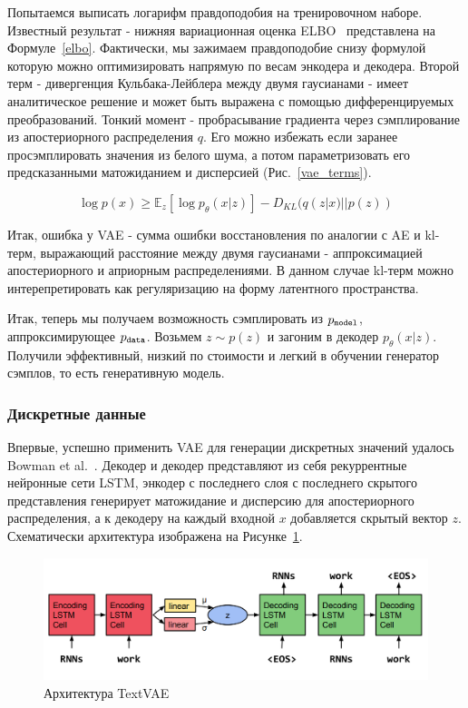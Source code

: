 \documentclass{spbau-diploma}
\begin{document}
Попытаемся выписать логарифм правдоподобия на тренировочном наборе. Известный 
результат - нижняя вариационная оценка ELBO~\cite{vae} представлена на 
Формуле~\ref{elbo}. Фактически, мы зажимаем правдоподобие снизу формулой которую
можно оптимизировать напрямую по весам энкодера и декодера. Второй терм - 
дивергенция Кульбака-Лейблера между двумя гаусианами - имеет аналитическое 
решение и может быть выражена с помощью дифференцируемых преобразований. Тонкий
момент - пробрасывание градиента через сэмплирование из апостериорного 
распределения $q$. Его можно избежать если заранее просэмплировать значения из
белого шума, а потом параметризовать его предсказанными матожиданием и 
дисперсией (Рис.~\ref{vae_terms}).

\begin{equation}
\label{elbo}
\log p(x) \geqslant \mathbb{E}_z{[\log p_{\theta}(x|z)]} - D_{KL}{(q(z|x) || p(z))}
\end{equation}

Итак, ошибка у VAE - сумма ошибки восстановления по аналогии с AE и kl-терм, 
выражающий расстояние между двумя гаусианами - аппроксимацией апостериорного и
априорным распределениями. В данном случае kl-терм можно интерепретировать как 
регуляризацию на форму латентного пространства.

Итак, теперь мы получаем возможность сэмплировать из $p_{\texttt{model}}$, 
аппроксимирующее $p_{\texttt{data}}$. Возьмем $z \sim p(z)$ и загоним в декодер 
$p_{\theta}{(x|z)}$. Получили эффективный, низкий по стоимости и легкий в 
обучении генератор сэмплов, то есть генеративную модель.

\subsubsection{Дискретные данные}
Впервые, успешно применить VAE для генерации дискретных значений удалось 
Bowman et al.~\cite{text_vae}. Декодер и декодер представляют из себя 
рекуррентные нейронные сети LSTM, энкодер с последнего слоя с последнего 
скрытого представления генерирует матожидание и дисперсию для апостериорного
распределения, а к декодеру на каждый входной $x$ добавляется скрытый вектор
$z$. Схематически архитектура изображена на Рисунке~\ref{text_vae}.

\begin{figure}[h]
\centering
\includegraphics[width=\textwidth]{images/text_vae.png}
\caption{Архитектура TextVAE}
\label{text_vae}
\end{figure}
\end{document}
